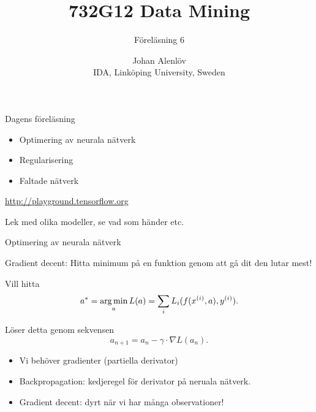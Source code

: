 \documentclass[10pt,english]{beamer}
\title{732G12 Data Mining}
\subtitle{Föreläsning 6}
\date{}
\author{Johan Alenlöv \\ IDA, Linköping University, Sweden}
\begin{document}
\maketitle

\begin{frame}{Dagens föreläsning}

    \begin{itemize}
        \item Optimering av neurala nätverk
        \item Regularisering
        \item Faltade nätverk
    \end{itemize}

    \url{http://playground.tensorflow.org}

    Lek med olika modeller, se vad som händer etc.
    
\end{frame}

\begin{frame}{Optimering av neurala nätverk}
    
    Gradient decent: Hitta minimum på en funktion genom att gå dit den lutar mest!

    Vill hitta
    \begin{equation*}
        a^* = \operatorname*{arg\,min}_a L(a) = \sum_i L_i(f(x^{(i)},a), y^{(i)}).
    \end{equation*}

    Löser detta genom sekvensen
    \begin{equation*}
        a_{n+1} = a_n - \gamma \cdot \nabla L(a_n).
    \end{equation*}

    \begin{itemize}
        \item Vi behöver gradienter (partiella derivator)
        \item Backpropagation: kedjeregel för derivator på neruala nätverk.
        \item Gradient decent: dyrt när vi har många observationer!
    \end{itemize}

\end{frame}
\end{document}
